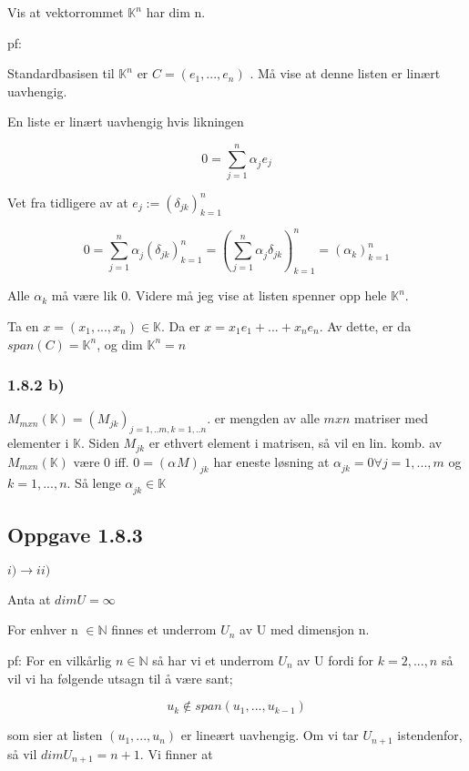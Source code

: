\documentclass[11pt]{article}
\begin{document}
Vis at vektorrommet $ \mathbb{K}^n $ har dim n. 


pf:

Standardbasisen til $ \mathbb{K} ^n$ er $ C = (e_1, ..., e_n) $ . Må vise at denne listen er linært uavhengig.

En liste er linært uavhengig hvis likningen 

\[
     0 = \sum_{ j=1 }^{ n } \alpha_{j}^{} e_j
\] 

Vet fra tidligere av at $ e_j := (\delta_{jk})_{k=1}^n $ 

\[
     0 = \sum_{ j=1 }^{ n } \alpha_{j}^{} (\delta_{jk})_{k=1}^n = (\sum_{ j=1 }^{ n } \alpha_{j}^{} \delta_{jk})_{k=1}^n = (\alpha_k)_{k=1}^n
\] 

Alle $ \alpha_k $ må være lik 0. Videre må jeg vise at listen spenner opp hele $ \mathbb{K}^n $.


Ta en $ x = (x_1, ..., x_n) \in \mathbb{K}$. Da er $ x = x_1e_1 + ... + x_n e_n $. Av dette, er da $ span(C) = \mathbb{K}^n $, og dim $ \mathbb{K}^n = n$   



\subsubsection{1.8.2 b)}

$ M_{mxn}(\mathbb{K})  = (M_{jk})_{j=1,..m, k=1,..n}$. er mengden av alle $ mxn $ matriser med elementer i $ \mathbb{K} $. Siden $ M_{jk} $ er ethvert element i matrisen, så vil en lin. komb. av $ M_{mxn} (\mathbb{K}) $ være 0 iff. $ 0 = (\alpha_{}^{} M)_{jk} $ har eneste løsning at $ \alpha_{jk}^{} =0 \forall j=1,...,m$ og $ k=1,...,n $. Så lenge $ \alpha_{jk}^{} \in \mathbb{K} $


\subsection{Oppgave 1.8.3}

$ i) \rightarrow ii) $   

Anta at $ dim U = \infty $ 

For enhver n $ \in  \mathbb{N}$ finnes et underrom $ U_n $ av U med dimensjon n. 

pf: 
For en vilkårlig $ n \in \mathbb{N} $ så har vi et underrom $ U_n $ av U fordi for $ k=2,...,n $ så vil vi ha følgende utsagn til å være sant;

\[
     u_k \notin span(u_1, ..., u_{k-1})
\] 

som sier at listen $ (u_1, ..., u_n) $ er lineært uavhengig. Om vi tar $ U_{n+1} $ istendenfor, så vil $ dim U_{n+1} = n+1$. Vi finner at
\end{document}
